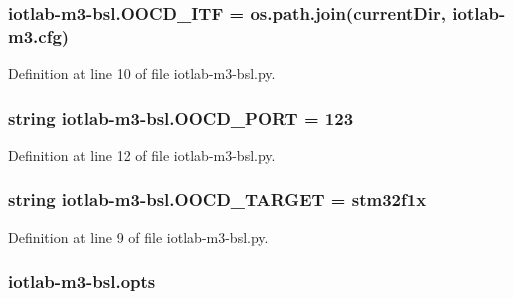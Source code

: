 \subsubsection[{\texorpdfstring{O\+O\+C\+D\+\_\+\+I\+TF}{OOCD_ITF}}]{\setlength{\rightskip}{0pt plus 5cm}iotlab-\/m3-\/bsl.\+O\+O\+C\+D\+\_\+\+I\+TF = os.\+path.\+join({\bf current\+Dir}, \textquotesingle{}iotlab-\/m3.\+cfg\textquotesingle{})}\hypertarget{namespaceiotlab-m3-bsl_a3f5093817dcb270957a3683f92607617}{}\label{namespaceiotlab-m3-bsl_a3f5093817dcb270957a3683f92607617}


Definition at line 10 of file iotlab-\/m3-\/bsl.\+py.

\subsubsection[{\texorpdfstring{O\+O\+C\+D\+\_\+\+P\+O\+RT}{OOCD_PORT}}]{\setlength{\rightskip}{0pt plus 5cm}string iotlab-\/m3-\/bsl.\+O\+O\+C\+D\+\_\+\+P\+O\+RT = \textquotesingle{}123\textquotesingle{}}\hypertarget{namespaceiotlab-m3-bsl_a41113cc544e144e779f94c942f9851e8}{}\label{namespaceiotlab-m3-bsl_a41113cc544e144e779f94c942f9851e8}


Definition at line 12 of file iotlab-\/m3-\/bsl.\+py.

\subsubsection[{\texorpdfstring{O\+O\+C\+D\+\_\+\+T\+A\+R\+G\+ET}{OOCD_TARGET}}]{\setlength{\rightskip}{0pt plus 5cm}string iotlab-\/m3-\/bsl.\+O\+O\+C\+D\+\_\+\+T\+A\+R\+G\+ET = \textquotesingle{}stm32f1x\textquotesingle{}}\hypertarget{namespaceiotlab-m3-bsl_a11b5e1a292d8f821269f1644702a4c6d}{}\label{namespaceiotlab-m3-bsl_a11b5e1a292d8f821269f1644702a4c6d}


Definition at line 9 of file iotlab-\/m3-\/bsl.\+py.

\subsubsection[{\texorpdfstring{opts}{opts}}]{\setlength{\rightskip}{0pt plus 5cm}iotlab-\/m3-\/bsl.\+opts}\hypertarget{namespaceiotlab-m3-bsl_a6c8a2e852a393282d5034a7564e13806}{}\label{namespaceiotlab-m3-bsl_a6c8a2e852a393282d5034a7564e13806}


